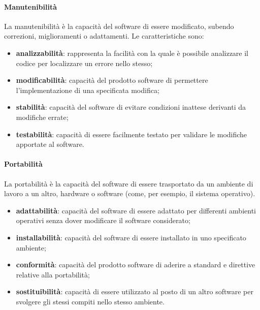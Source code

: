 \paragraph{Manutenibilità}
La manutenibilità è la capacità del software di essere modificato, subendo correzioni, miglioramenti o adattamenti. Le caratteristiche sono:
\begin{itemize}
\item \textbf{analizzabilità}: rappresenta la facilità con la quale è possibile analizzare il codice per localizzare un errore nello stesso;
\item \textbf{modificabilità}: capacità del prodotto software di permettere l'implementazione di una specificata modifica;
\item \textbf{stabilità}: capacità del software di evitare condizioni inattese derivanti da modifiche errate;
\item \textbf{testabilità}: capacità di essere facilmente testato per validare le modifiche apportate al software.
\end{itemize}

\paragraph{Portabilità}
La portabilità è la capacità del software di essere trasportato da un ambiente di lavoro a un altro, hardware o software (come, per esempio, il sistema operativo).
\begin{itemize}
\item \textbf{adattabilità}: capacità del software di essere adattato per differenti ambienti operativi senza dover modificare il software considerato;
\item \textbf{installabilità}: capacità del software di essere installato in uno specificato ambiente;
\item \textbf{conformità}: capacità del prodotto software di aderire a standard e direttive relative alla portabilità;
\item \textbf{sostituibilità}: capacità di essere utilizzato al posto di un altro software per svolgere gli stessi compiti nello stesso ambiente.
\end{itemize}

